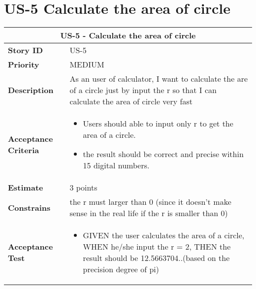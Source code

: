 \documentclass[12pt]{report}
\begin{document}
{\section{US-5 Calculate the area of circle }
\begin{tabular}{ |p{4cm}|p{11cm}| }
 \hline
 \multicolumn{2}{|c|}{US-5 - Calculate the area of circle } \\
 \hline
 \textbf {Story ID}& US-5  \\
 \hline
 \textbf{Priority} & MEDIUM \\
 \hline
  \textbf{Description}   & As an user of calculator, I want to calculate the are of a circle just by input the r so that I can calculate the area of circle very fast  \\
  \hline
  \textbf{Acceptance Criteria}& 
   \begin{itemize}
     \item  Users should able to input only r to get the area of a circle. 
     \item  the result should be correct and precise within 15 digital numbers.
\end{itemize}
  \\
 \hline
 \textbf{Estimate} & 3 points   \\
 \hline
 \textbf{Constrains}& the r must larger than 0 (since it doesn't make sense in the real life if the r is smaller than 0) \\
 \hline
  \textbf{Acceptance Test}& 
   \begin{itemize}
     \item  GIVEN the user calculates the area of a circle, WHEN he/she input the r = 2, THEN the result should be  12.5663704..(based on the precision degree of pi)
\end{itemize}
  \\
 \hline
\end{tabular}


}
\end{document}
